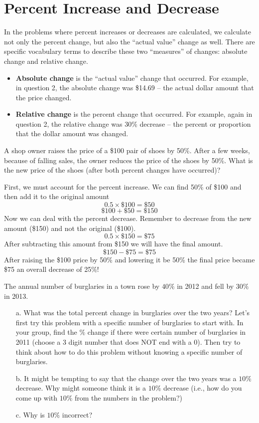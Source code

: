 \documentclass{ximera}
\begin{document}
\section{Percent Increase and Decrease}
In the problems where percent increases or decreases are calculated, we calculate not only the percent change, but also the “actual value” change as well.  There are specific vocabulary terms to describe these two “measures” of changes: absolute change and relative change. 
\begin{itemize}
    \item \textbf{Absolute change} is the “actual value” change that occurred.  For example, in question 2, the absolute change was \$14.69 -- the actual dollar amount that the price changed. 
    \item \textbf{Relative change} is the percent change that occurred.  For example, again in question 2, the relative change was 30\% decrease -- the percent or proportion that the dollar amount was changed. 
\end{itemize}
\begin{example}
A shop owner raises the price of a \$100 pair of shoes by 50\%. After a few weeks, because of falling sales, the owner reduces the price of the shoes by 50\%.
What is the new price of the shoes (after both percent changes have occurred)?
\\
\begin{explanation}
First, we must account for the percent increase. We can find 50\% of \$100 and then add it to the original amount
\[
0.5 \times \$100 = \$50
\]
\[
\$ 100 + \$50 = \$ 150
\]
Now we can deal with the percent decrease. Remember to decrease from the new amount (\$150) and not the original (\$100).
\[
0.5 \times \$150 = \$75
\]
After subtracting this amount from \$150 we will have the final amount.
\[
\$ 150 - \$75 = \$ 75
\]
After raising the \$100 price by 50\% and lowering it be 50\% the final price became \$75 an overall decrease of 25\%!
\end{explanation}
\end{example}
\begin{exploration}
The annual number of burglaries in a town rose by $40\%$ in 2012 and fell by $30\%$ in 2013.
\begin{itemize}
\item[a.] What was the total percent change in burglaries over the two years?
Let’s first try this problem with a specific number of burglaries to start with.  In your group, find the $\%$ change if there were certain number of burglaries in 2011 (choose a 3 digit number that does NOT end with a 0).  Then try to think about how to do this problem without knowing a specific number of burglaries.
\item[b.] It might be tempting to say that the change over the two years was a $10\%$ decrease.  Why might someone think it is a $10\%$ decrease (i.e., how do you come up with $10\%$ from the numbers in the problem?)
\item[c.] Why is $10\%$ incorrect?
\end{itemize}
\end{exploration}
\end{document}
